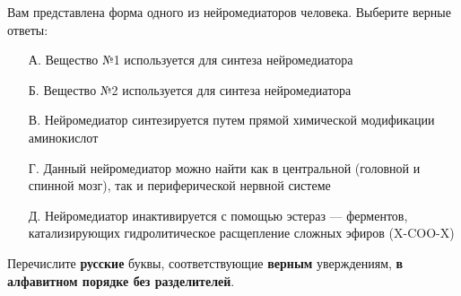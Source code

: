 

Вам представлена форма одного из нейромедиаторов человека. Выберите верные ответы:
\begin{enumerate}
    \item[А.] Вещество №1 используется для синтеза нейромедиатора
    \item[Б.] Вещество №2 используется для синтеза нейромедиатора
    \item[В.] Нейромедиатор синтезируется путем прямой химической модификации аминокислот
    \item[Г.] Данный нейромедиатор можно найти как в центральной (головной и спинной мозг), так и периферической нервной системе
    \item[Д.] Нейромедиатор инактивируется с помощью эстераз — ферментов, катализирующих гидролитическое расщепление сложных эфиров (X-COO-X)
\end{enumerate} 

Перечислите \textbf{русские} буквы, соответствующие \textbf{верным} уверждениям, \textbf{в алфавитном порядке без разделителей}.

